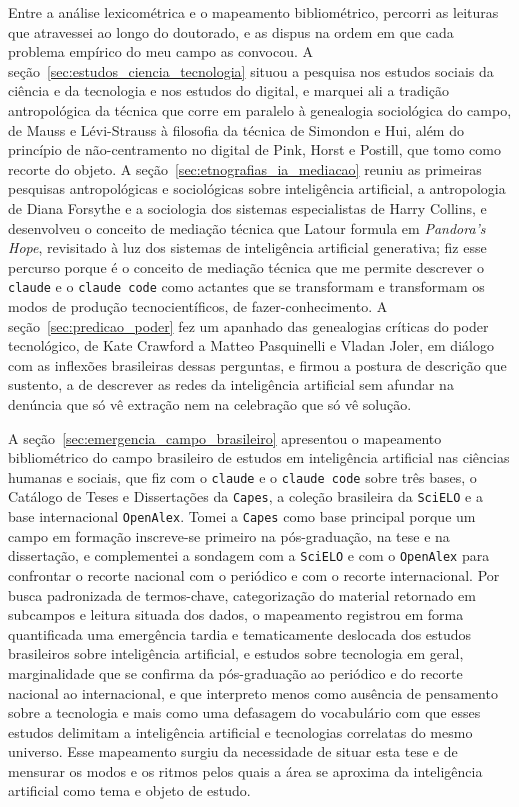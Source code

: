 Entre a análise lexicométrica e o mapeamento bibliométrico, percorri as leituras que atravessei ao longo do doutorado, e as dispus na ordem em que cada problema empírico do meu campo as convocou. A seção~\ref{sec:estudos_ciencia_tecnologia} situou a pesquisa nos estudos sociais da ciência e da tecnologia e nos estudos do digital, e marquei ali a tradição antropológica da técnica que corre em paralelo à genealogia sociológica do campo, de Mauss e Lévi-Strauss à filosofia da técnica de Simondon e Hui, além do princípio de não-centramento no digital de Pink, Horst e Postill, que tomo como recorte do objeto. A seção~\ref{sec:etnografias_ia_mediacao} reuniu as primeiras pesquisas antropológicas e sociológicas sobre inteligência artificial, a antropologia de Diana Forsythe e a sociologia dos sistemas especialistas de Harry Collins, e desenvolveu o conceito de mediação técnica que Latour formula em \emph{Pandora's Hope}, revisitado à luz dos sistemas de inteligência artificial generativa; fiz esse percurso porque é o conceito de mediação técnica que me permite descrever o \texttt{claude} e o \texttt{claude code} como actantes que se transformam e transformam os modos de produção tecnocientíficos, de fazer-conhecimento. A seção~\ref{sec:predicao_poder} fez um apanhado das genealogias críticas do poder tecnológico, de Kate Crawford a Matteo Pasquinelli e Vladan Joler, em diálogo com as inflexões brasileiras dessas perguntas, e firmou a postura de descrição que sustento, a de descrever as redes da inteligência artificial sem afundar na denúncia que só vê extração nem na celebração que só vê solução. 

A seção~\ref{sec:emergencia_campo_brasileiro} apresentou o mapeamento bibliométrico do campo brasileiro de estudos em inteligência artificial nas ciências humanas e sociais, que fiz com o \texttt{claude} e o \texttt{claude code} sobre três bases, o Catálogo de Teses e Dissertações da \texttt{Capes}, a coleção brasileira da \texttt{SciELO} e a base internacional \texttt{OpenAlex}. Tomei a \texttt{Capes} como base principal porque um campo em formação inscreve-se primeiro na pós-graduação, na tese e na dissertação, e complementei a sondagem com a \texttt{SciELO} e com o \texttt{OpenAlex} para confrontar o recorte nacional com o periódico e com o recorte internacional. Por busca padronizada de termos-chave, categorização do material retornado em subcampos e leitura situada dos dados, o mapeamento registrou em forma quantificada uma emergência tardia e tematicamente deslocada dos estudos brasileiros sobre inteligência artificial, e estudos sobre tecnologia em geral, marginalidade que se confirma da pós-graduação ao periódico e do recorte nacional ao internacional, e que interpreto menos como ausência de pensamento sobre a tecnologia e mais como uma defasagem do vocabulário com que esses estudos delimitam a inteligência artificial e tecnologias correlatas do mesmo universo. Esse mapeamento surgiu da necessidade de situar esta tese e de mensurar os modos e os ritmos pelos quais a área se aproxima da inteligência artificial como tema e objeto de estudo.

